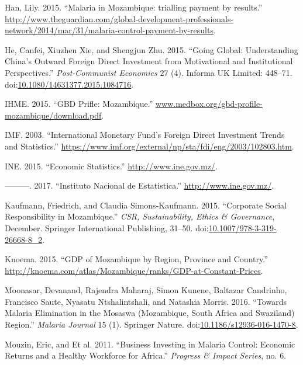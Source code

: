 \documentclass[]{article}
\begin{document}
\hypertarget{ref-Han}{}
Han, Lily. 2015. ``Malaria in Mozambique: trialling payment by
results.''
\url{http://www.theguardian.com/global-development-professionals-network/2014/mar/31/malaria-control-payment-by-results}.

\hypertarget{ref-He_2015}{}
He, Canfei, Xiuzhen Xie, and Shengjun Zhu. 2015. ``Going Global:
Understanding China's Outward Foreign Direct Investment from
Motivational and Institutional Perspectives.'' \emph{Post-Communist
Economies} 27 (4). Informa UK Limited: 448--71.
doi:\href{https://doi.org/10.1080/14631377.2015.1084716}{10.1080/14631377.2015.1084716}.

\hypertarget{ref-ihme}{}
IHME. 2015. ``GBD Prifle: Mozambique.''
\url{www.medbox.org/gbd-profile-mozambique/download.pdf}.

\hypertarget{ref-imf}{}
IMF. 2003. ``International Monetary Fund's Foreign Direct Investment
Trends and Statistics.''
\url{https://www.imf.org/external/np/sta/fdi/eng/2003/102803.htm}.

\hypertarget{ref-estatistica}{}
INE. 2015. ``Economic Statistics.'' \url{http://www.ine.gov.mz/}.

\hypertarget{ref-ine}{}
---------. 2017. ``Instituto Nacional de Estatistica.''
\url{http://www.ine.gov.mz/}.

\hypertarget{ref-Kaufmann_2015}{}
Kaufmann, Friedrich, and Claudia Simons-Kaufmann. 2015. ``Corporate
Social Responsibility in Mozambique.'' \emph{CSR, Sustainability, Ethics
\& Governance}, December. Springer International Publishing, 31--50.
doi:\href{https://doi.org/10.1007/978-3-319-26668-8_2}{10.1007/978-3-319-26668-8\_2}.

\hypertarget{ref-knoema}{}
Knoema. 2015. ``GDP of Mozambique by Region, Province and Country.''
\url{http://knoema.com/atlas/Mozambique/ranks/GDP-at-Constant-Prices}.

\hypertarget{ref-Moonasar_2016}{}
Moonasar, Devanand, Rajendra Maharaj, Simon Kunene, Baltazar Candrinho,
Francisco Saute, Nyasatu Ntshalintshali, and Natashia Morris. 2016.
``Towards Malaria Elimination in the Mosaswa (Mozambique, South Africa
and Swaziland) Region.'' \emph{Malaria Journal} 15 (1). Springer Nature.
doi:\href{https://doi.org/10.1186/s12936-016-1470-8}{10.1186/s12936-016-1470-8}.

\hypertarget{ref-Mouzin2011}{}
Mouzin, Eric, and Et al. 2011. ``Business Investing in Malaria Control:
Economic Returns and a Healthy Workforce for Africa.'' \emph{Progress \&
Impact Series}, no. 6.
\end{document}
